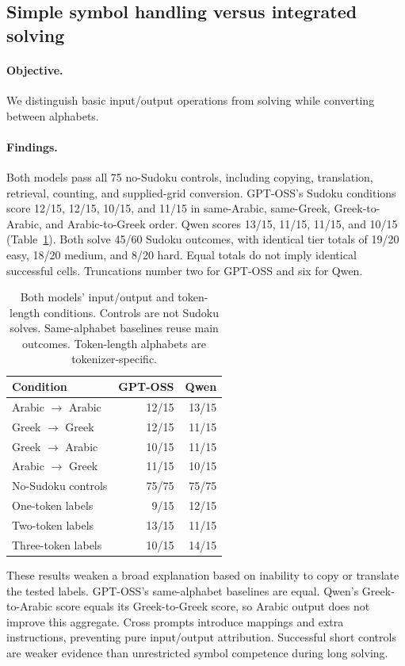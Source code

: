 \documentclass[11pt]{article}
\begin{document}
\subsection{Simple symbol handling versus integrated solving}
\paragraph{Objective.} We distinguish basic input/output operations from solving while converting between alphabets.
\paragraph{Findings.} Both models pass all 75 no-Sudoku controls, including copying, translation, retrieval, counting, and supplied-grid conversion. GPT-OSS's Sudoku conditions score 12/15, 12/15, 10/15, and 11/15 in same-Arabic, same-Greek, Greek-to-Arabic, and Arabic-to-Greek order. Qwen scores 13/15, 11/15, 11/15, and 10/15 (Table~\ref{tab:mechanisms}). Both solve 45/60 Sudoku outcomes, with identical tier totals of 19/20 easy, 18/20 medium, and 8/20 hard. Equal totals do not imply identical successful cells. Truncations number two for GPT-OSS and six for Qwen.

\begin{table}[t]
\centering\small
\begin{tabular}{lrr}
\toprule
Condition & GPT-OSS & Qwen\\
\midrule
Arabic $\rightarrow$ Arabic & 12/15 & 13/15\\
Greek $\rightarrow$ Greek & 12/15 & 11/15\\
Greek $\rightarrow$ Arabic & 10/15 & 11/15\\
Arabic $\rightarrow$ Greek & 11/15 & 10/15\\
No-Sudoku controls & 75/75 & 75/75\\
\midrule
One-token labels & 9/15 & 12/15\\
Two-token labels & 13/15 & 11/15\\
Three-token labels & 10/15 & 14/15\\
\bottomrule
\end{tabular}
\caption{Both models' input/output and token-length conditions. Controls are not Sudoku solves. Same-alphabet baselines reuse main outcomes. Token-length alphabets are tokenizer-specific.}
\label{tab:mechanisms}
\end{table}

These results weaken a broad explanation based on inability to copy or translate the tested labels. GPT-OSS's same-alphabet baselines are equal. Qwen's Greek-to-Arabic score equals its Greek-to-Greek score, so Arabic output does not improve this aggregate. Cross prompts introduce mappings and extra instructions, preventing pure input/output attribution. Successful short controls are weaker evidence than unrestricted symbol competence during long solving.
\end{document}
